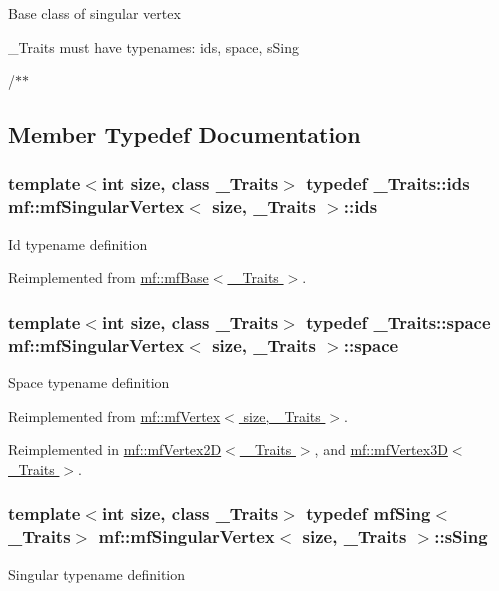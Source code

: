 Base class of singular vertex

\_\-Traits must have typenames: ids, space, sSing

/$\ast$$\ast$ 

\subsection{Member Typedef Documentation}
\hypertarget{classmf_1_1mfSingularVertex_ad951601375961980e2ad033de57e14a1}{
\subsubsection[{ids}]{\setlength{\rightskip}{0pt plus 5cm}template$<$int size, class \_\-Traits$>$ typedef \_\-Traits::ids {\bf mf::mfSingularVertex}$<$ size, \_\-Traits $>$::{\bf ids}}}
\label{classmf_1_1mfSingularVertex_ad951601375961980e2ad033de57e14a1}
Id typename definition 

Reimplemented from \hyperlink{classmf_1_1mfBase_a3b23f16ddf59da0a91ab12cf57c1f111}{mf::mfBase$<$ \_\-Traits $>$}.

\hypertarget{classmf_1_1mfSingularVertex_a96d4909dd62a8e8889eda76d0148db2a}{
\subsubsection[{space}]{\setlength{\rightskip}{0pt plus 5cm}template$<$int size, class \_\-Traits$>$ typedef \_\-Traits::space {\bf mf::mfSingularVertex}$<$ size, \_\-Traits $>$::{\bf space}}}
\label{classmf_1_1mfSingularVertex_a96d4909dd62a8e8889eda76d0148db2a}
Space typename definition 

Reimplemented from \hyperlink{classmf_1_1mfVertex_a9710b0b7ac7bbb276e1e97d541cbfc93}{mf::mfVertex$<$ size, \_\-Traits $>$}.



Reimplemented in \hyperlink{classmf_1_1mfVertex2D_a0730a219bea43b0b049cae2b4c72527b}{mf::mfVertex2D$<$ \_\-Traits $>$}, and \hyperlink{classmf_1_1mfVertex3D_a16aa06a4ca21fae048fa56b7a40ac088}{mf::mfVertex3D$<$ \_\-Traits $>$}.

\hypertarget{classmf_1_1mfSingularVertex_ac992cd55c8554406174a3a1449af209b}{
\subsubsection[{sSing}]{\setlength{\rightskip}{0pt plus 5cm}template$<$int size, class \_\-Traits$>$ typedef {\bf mfSing}$<$\_\-Traits$>$ {\bf mf::mfSingularVertex}$<$ size, \_\-Traits $>$::{\bf sSing}}}
\label{classmf_1_1mfSingularVertex_ac992cd55c8554406174a3a1449af209b}
Singular typename definition 

